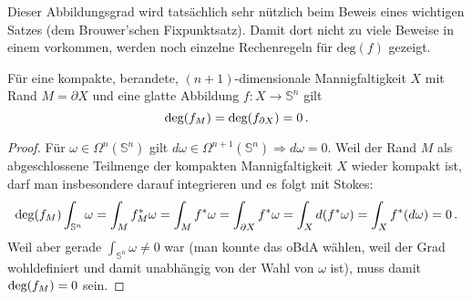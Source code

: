 \documentclass[../H_Analysis_main.tex]{subfiles}
\begin{document}
Dieser Abbildungsgrad wird tatsächlich sehr nützlich beim Beweis eines wichtigen Satzes (dem Brouwer'schen Fixpunktsatz). Damit dort nicht zu viele Beweise in einem vorkommen, werden noch einzelne Rechenregeln für $\text{deg}(f)$ gezeigt.

\begin{lemma}
Für eine kompakte, berandete, $(n + 1)$-dimensionale Mannigfaltigkeit $X$ mit Rand $M = \partial X$ und eine glatte Abbildung $f: X \rightarrow \mathbb{S}^n$ gilt
\begin{equation}
\text{deg}\qty(f_M) = \text{deg}\qty(f_{\partial X}) = 0 \, .
\end{equation}
\end{lemma}
\begin{proof}
Für $\omega \in \Omega^n(\mathbb{S}^n)$ gilt $d\omega \in \Omega^{n + 1}(\mathbb{S}^n) \Rightarrow d\omega = 0$. Weil der Rand $M$ als abgeschlossene Teilmenge der kompakten Mannigfaltigkeit $X$ wieder kompakt ist, darf man insbesondere darauf integrieren und es folgt mit Stokes:
\begin{equation*}
\text{deg}\qty(f_M) \int_{\mathbb{S}^n} \omega = \int_M f_M^* \omega = \int_M f^* \omega = \int_{\partial X} f^*\omega = \int_X d\qty(f^*\omega) = \int_X f^*\qty(d\omega) = 0 \, .
\end{equation*}
Weil aber gerade $\int_{\mathbb{S}^n} \omega \neq 0$ war (man konnte das oBdA wählen, weil der Grad wohldefiniert und damit unabhängig von der Wahl von $\omega$ ist), muss damit $\text{deg}\qty(f_M) = 0$ sein.
\end{proof}
\end{document}
